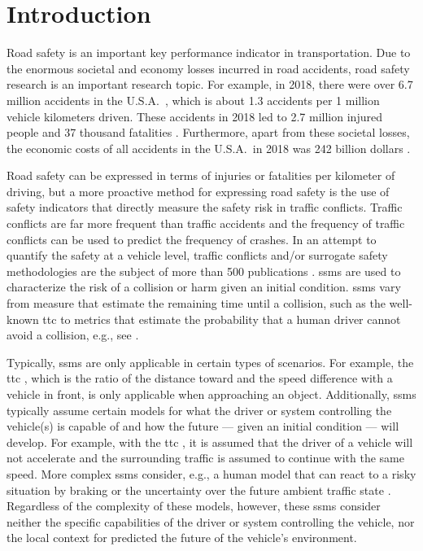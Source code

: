 \section{Introduction}
\label{sec:introduction}

Road safety is an important key performance indicator in transportation. 
Due to the enormous societal and economy losses incurred in road accidents, road safety research is an important research topic.
For example, in 2018, there were over 6.7 million accidents in the U.S.A.\ \autocite{nhtsa2020summary}, which is about 1.3 accidents per 1 million vehicle kilometers driven.
These accidents in 2018 led to 2.7 million injured people and 37 thousand fatalities \autocite{nhtsa2020summary}.
Furthermore, apart from these societal losses, the economic costs of all accidents in the U.S.A.\ in 2018 was 242 billion dollars \autocite{nhtsa2020summary}.

Road safety can be expressed in terms of injuries or fatalities per kilometer of driving, but a more proactive method for expressing road safety is the use of safety indicators that directly measure the safety risk in traffic conflicts.
Traffic conflicts are far more frequent than traffic accidents and the frequency of traffic conflicts can be used to predict the frequency of crashes.
In an attempt to quantify the safety at a vehicle level, traffic conflicts and/or surrogate safety methodologies are the subject of more than 500 publications \autocite{arun2021systematic}.
\acp{ssm} are used to characterize the risk of a collision or harm given an initial condition. 
\acp{ssm} vary from measure that estimate the remaining time until a collision, such as the well-known \ac{ttc} \autocite{hayward1972near} to metrics that estimate the probability that a human driver cannot avoid a collision, e.g., see \autocite{wang2014evaluation}.

Typically, \acp{ssm} are only applicable in certain types of scenarios.
For example, the \ac{ttc} \autocite{hayward1972near}, which is the ratio of the distance toward and the speed difference with a vehicle in front, is only applicable when approaching an object.
Additionally, \acp{ssm} typically assume certain models for what the driver or system controlling the vehicle(s) is capable of and how the future --- given an initial condition --- will develop. 
For example, with the \ac{ttc} \autocite{hayward1972near}, it is assumed that the driver of a vehicle will not accelerate and the surrounding traffic is assumed to continue with the same speed. 
More complex \acp{ssm} consider, e.g., a human model that can react to a risky situation by braking \autocite{wang2014evaluation} or the uncertainty over the future ambient traffic state \autocite{mullakkal2020probabilistic}.
Regardless of the complexity of these models, however, these \acp{ssm} consider neither the specific capabilities of the driver or system controlling the vehicle, nor the local context for predicted the future of the vehicle's environment.  

